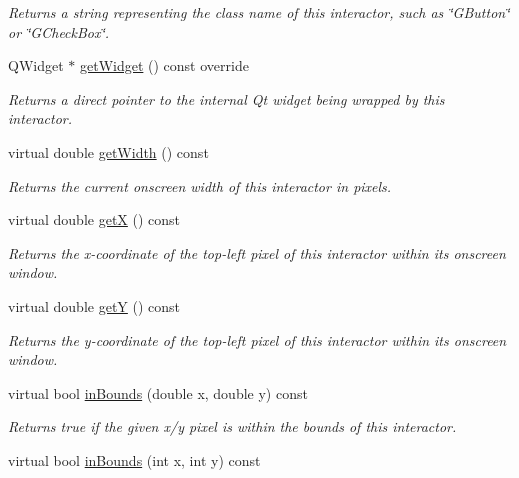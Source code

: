 \begin{DoxyCompactItemize}
\begin{DoxyCompactList}\small\item\em Returns a string representing the class name of this interactor, such as \char`\"{}\+G\+Button\char`\"{} or \char`\"{}\+G\+Check\+Box\char`\"{}. \end{DoxyCompactList}\item 
Q\+Widget $\ast$ \mbox{\hyperlink{classsgl_1_1GContainer_a3b33a602b31a6b809d020535a59db3b4}{get\+Widget}} () const override
\begin{DoxyCompactList}\small\item\em Returns a direct pointer to the internal Qt widget being wrapped by this interactor. \end{DoxyCompactList}\item 
virtual double \mbox{\hyperlink{classsgl_1_1GInteractor_a0ed2965abd4f5701d2cadf71239faf19}{get\+Width}} () const
\begin{DoxyCompactList}\small\item\em Returns the current onscreen width of this interactor in pixels. \end{DoxyCompactList}\item 
virtual double \mbox{\hyperlink{classsgl_1_1GInteractor_a344385751bee0720059403940d57a13e}{getX}} () const
\begin{DoxyCompactList}\small\item\em Returns the x-\/coordinate of the top-\/left pixel of this interactor within its onscreen window. \end{DoxyCompactList}\item 
virtual double \mbox{\hyperlink{classsgl_1_1GInteractor_aafa51c7f8f38a09febbb9ce7853f77b4}{getY}} () const
\begin{DoxyCompactList}\small\item\em Returns the y-\/coordinate of the top-\/left pixel of this interactor within its onscreen window. \end{DoxyCompactList}\item 
virtual bool \mbox{\hyperlink{classsgl_1_1GInteractor_afc480f652b8c5f1fb255e2269ce68879}{in\+Bounds}} (double x, double y) const
\begin{DoxyCompactList}\small\item\em Returns true if the given x/y pixel is within the bounds of this interactor. \end{DoxyCompactList}\item 
virtual bool \mbox{\hyperlink{classsgl_1_1GInteractor_ae6d7982c1c627b677a5e776ca86118ed}{in\+Bounds}} (int x, int y) const

\end{DoxyCompactItemize}
